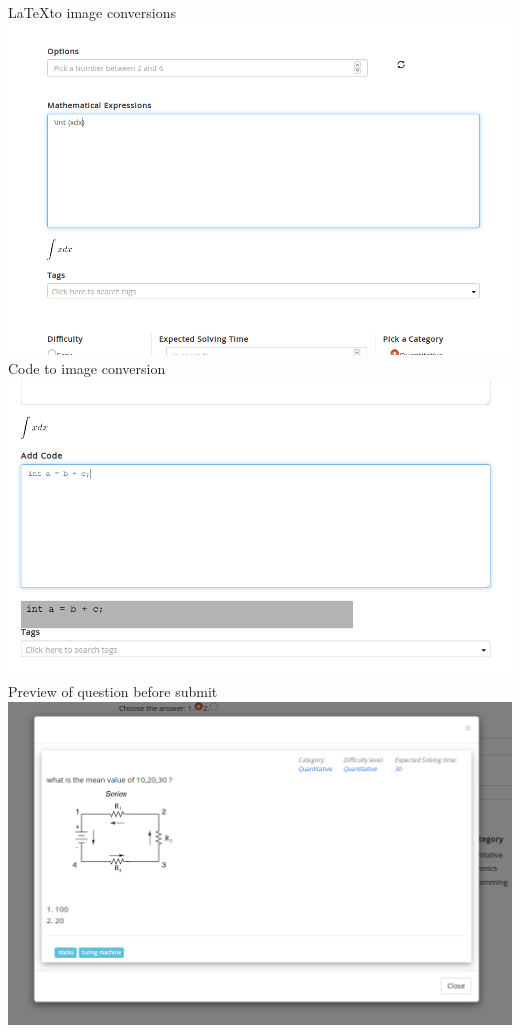 \documentclass[a4paper,12pt,oneside]{book}
\begin{document}
\vspace{0.7in}
\LaTeX to image conversions\\
\includegraphics[scale=0.4]{compose5.png}	\\

\vspace{2in}
\newpage Code to image conversion \\
\includegraphics[scale=0.45]{compose7.png}	\\

\vspace{0.7in}
Preview of question before submit\\
\includegraphics[scale=0.37]{preview.png}	\\
\end{document}
